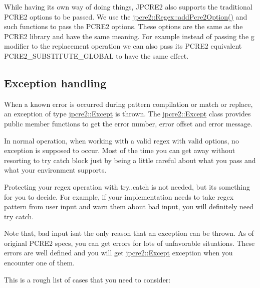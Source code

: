 While having its own way of doing things, J\+P\+C\+R\+E2 also supports the traditional P\+C\+R\+E2 options to be passed. We use the {\ttfamily \hyperlink{classjpcre2_1_1Regex_a2c7dcf12f26b2b046e147b013c8b5087_a2c7dcf12f26b2b046e147b013c8b5087}{jpcre2\+::\+Regex\+::add\+Pcre2\+Option()}} and such functions to pass the P\+C\+R\+E2 options. These options are the same as the P\+C\+R\+E2 library and have the same meaning. For example instead of passing the \textquotesingle{}g\textquotesingle{} modifier to the replacement operation we can also pass its P\+C\+R\+E2 equivalent {\ttfamily P\+C\+R\+E2\+\_\+\+S\+U\+B\+S\+T\+I\+T\+U\+T\+E\+\_\+\+G\+L\+O\+B\+AL} to have the same effect.\hypertarget{index_exception-handling}{}\subsection{Exception handling}\label{index_exception-handling}
When a known error is occurred during pattern compilation or match or replace, an exception of type {\ttfamily \hyperlink{classjpcre2_1_1Except}{jpcre2\+::\+Except}} is thrown. The {\ttfamily \hyperlink{classjpcre2_1_1Except}{jpcre2\+::\+Except}} class provides public member functions to get the error number, error offset and error message.

In normal operation, when working with a valid regex with valid options, no exception is supposed to occur. Most of the time you can get away without resorting to try catch block just by being a little careful about what you pass and what your environment supports.

Protecting your regex operation with try..catch is not needed, but it\textquotesingle{}s something for you to decide. For example, if your implementation needs to take regex pattern from user input and warn them about bad input, you will definitely need try catch.

Note that, bad input isn\textquotesingle{}t the only reason that an exception can be thrown. As of original P\+C\+R\+E2 specs, you can get errors for lots of unfavorable situations. These errors are well defined and you will get {\ttfamily \hyperlink{classjpcre2_1_1Except}{jpcre2\+::\+Except}} exception when you encounter one of them.

This is a rough list of cases that you need to consider\+:


